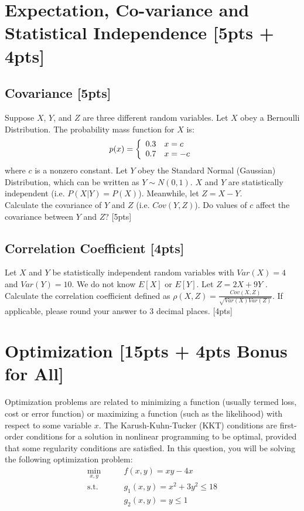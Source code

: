 \documentclass{article}
\begin{document}
\newpage



\section{Expectation, Co-variance and Statistical Independence [5pts + 4pts]}
\subsection{Covariance [5pts]}
Suppose $X$, $Y$, and $Z$ are three different random variables.
Let $X$ obey a Bernoulli Distribution. The probability mass function for $X$ is:
    $$p(x)=\left\{
    \begin{array}{ c l}	
        0.3 & x = c\\
        0.7 & x = -c
    \end{array}\right.$$
where $c$ is a nonzero constant. Let $Y$ obey the Standard Normal (Gaussian) Distribution, which can be written as $Y \sim N(0,1)$. $X$ and $Y$ are statistically independent (i.e. $P(X|Y) = P(X)$). Meanwhile, let $Z = X-Y$. \\

\newline 
\noindent Calculate the covariance of $Y$ and $Z$ (i.e. $Cov(Y, Z)$). Do values of $c$ affect the covariance between $Y$ and $Z$? [5pts]



\newpage

\subsection{Correlation Coefficient [4pts]}
Let $X$ and $Y$ be statistically independent random variables with $Var(X) = 4$ and $Var(Y) = 10$. We do not know $E[X]$ or $E[Y]$. Let $Z = 2X + 9Y$ . Calculate the correlation coefficient defined as $\rho(X,Z)=\frac{Cov(X,Z)}{\sqrt{Var(X)Var(Z)}}$. If applicable, please round your answer to 3 decimal places. [4pts]




\newpage
\section{Optimization [15pts + 4pts Bonus for All]}
Optimization problems are related to minimizing a function (usually termed loss, cost or error function) or maximizing a function (such as the likelihood) with respect to some variable $x$. The Karush-Kuhn-Tucker (KKT) conditions are first-order conditions for a solution in nonlinear programming to be optimal, provided that some regularity conditions are satisfied. In this question, you will be solving the following optimization problem:
\begin{align*}
    \min_{x,y} \qquad & f(x,y) = xy-4x \\
    \text{s.t.} \qquad & g_{1}(x,y) = x^{2}+3y^{2}\leq 18 \\
    & g_{2}(x,y) = y \leq 1
\end{align*}
\end{document}
